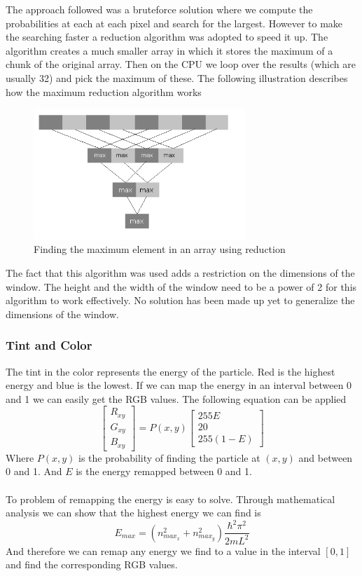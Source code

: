 \documentclass[a4paper, 10pt]{article}
\begin{document}
        The approach followed was a bruteforce solution where we compute the probabilities at each at each
        pixel and search for the largest. However to make the searching faster a reduction algorithm
        was adopted to speed it up. The algorithm creates a much smaller array in which it stores
        the maximum of a chunk of the original array. Then on the CPU we loop over the results (which are
        usually 32) and pick the maximum of these. The following illustration describes how the maximum
        reduction algorithm works
        \begin{figure}[hb]
            \centering
                \includegraphics[width=8cm]{graphics/max_reduction.png}
            \caption{Finding the maximum element in an array using reduction}
        \end{figure}
        The fact that this algorithm was used adds a restriction on the dimensions of the window. The height
        and the width of the window need to be a power of 2 for this algorithm to work effectively.
        No solution has been made up yet to generalize the dimensions of the window.
        
        \subsubsection{Tint and Color}
        The tint in the color represents the energy of the particle. Red is the highest
        energy and blue is the lowest. If we can map the energy in an interval between
        0 and 1 we can easily get the RGB values. The following equation can be applied
        $$ \begin{bmatrix} R_{xy} \\ G_{xy} \\ B_{xy} \end{bmatrix} = P(x, y)
        \begin{bmatrix} 255E \\ 20 \\ 255(1-E) \end{bmatrix} $$
        Where $P(x, y)$ is the probability of finding the particle at $(x, y)$ and between
        0 and 1. And $E$ is the energy remapped between 0 and 1. \\\\
        To problem of remapping the energy is easy to solve. Through mathematical analysis
        we can show that the highest energy we can find is
        $$ E_{max} = (n^2_{max_x} + n^2_{max_y})\frac{\hbar^2\pi^2}{2mL^2} $$
        And therefore we can remap any energy we find to a value in the interval $[0, 1]$
        and find the corresponding RGB values.
\end{document}
